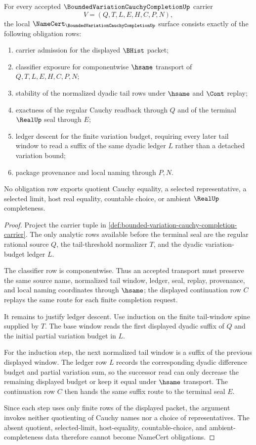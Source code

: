 \begin{theorem}
\label{thm:bounded-variation-cauchy-completion-obligations}
For every accepted $\BoundedVariationCauchyCompletionUp$ carrier
$$
V=(Q,T,L,E,H,C,P,N),
$$
the local $\NameCert_{\BoundedVariationCauchyCompletionUp}$ surface consists exactly of the following obligation rows:
\begin{enumerate}
\item carrier admission for the displayed $\BHist$ packet;
\item classifier exposure for componentwise $\hsame$ transport of $Q,T,L,E,H,C,P,N$;
\item stability of the normalized dyadic tail rows under $\hsame$ and $\Cont$ replay;
\item exactness of the regular Cauchy readback through $Q$ and of the terminal $\RealUp$ seal through $E$;
\item ledger descent for the finite variation budget, requiring every later tail window to read a suffix of the same dyadic ledger $L$ rather than a detached variation bound;
\item package provenance and local naming through $P,N$.
\end{enumerate}
No obligation row exports quotient Cauchy equality, a selected representative, a selected limit, host real equality, countable choice, or ambient $\RealUp$ completeness.
\end{theorem}
\begin{proof}
Project the carrier tuple in \autoref{def:bounded-variation-cauchy-completion-carrier}. The only analytic rows available before the terminal seal are the regular rational source $Q$, the tail-threshold normalizer $T$, and the dyadic variation-budget ledger $L$.

The classifier row is componentwise. Thus an accepted transport must preserve the same source name, normalized tail window, ledger, seal, replay, provenance, and local naming coordinates through $\hsame$; the displayed continuation row $C$ replays the same route for each finite completion request.

It remains to justify ledger descent. Use induction on the finite tail-window spine supplied by $T$. The base window reads the first displayed dyadic suffix of $Q$ and the initial partial variation budget in $L$.

For the induction step, the next normalized tail window is a suffix of the previous displayed window. The ledger row $L$ records the corresponding dyadic difference budget and partial variation sum, so the successor read can only decrease the remaining displayed budget or keep it equal under $\hsame$ transport. The continuation row $C$ then hands the same suffix route to the terminal seal $E$.

Since each step uses only finite rows of the displayed packet, the argument invokes neither quotienting of Cauchy names nor a choice of representatives. The absent quotient, selected-limit, host-equality, countable-choice, and ambient-completeness data therefore cannot become NameCert obligations.
\end{proof}

